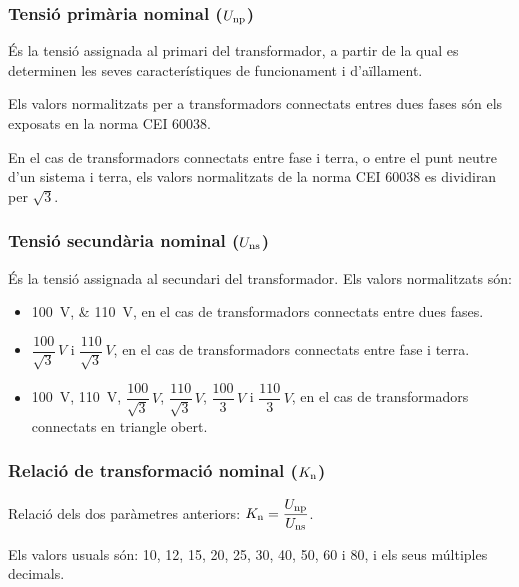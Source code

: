 \subsubsection{Tensió primària nominal ($U_\mathrm{np}$)}

És la tensió assignada al primari del transformador, a partir de la
qual es determinen les seves característiques de funcionament i
d'aïllament.

Els valors normalitzats per a transformadors connectats entres dues fases són els exposats en la norma CEI 60038.

En el cas de transformadors connectats entre fase i terra, o entre el punt neutre d'un sistema i terra, els valors normalitzats de la norma CEI 60038 es dividiran per $\sqrt{3}$.


\subsubsection{Tensió secundària nominal ($U_\mathrm{ns}$)}

És la tensió assignada al secundari del transformador.
Els valors normalitzats són:
\begin{itemize}
    \item \SIlist{100;110}{V}, en el cas de transformadors connectats
    entre dues fases.
    \item $\dfrac{100}{\sqrt{3}}\si{\,V}$ i
        $\dfrac{110}{\sqrt{3}}\si{\,V}$, en el cas de transformadors
        connectats entre fase i terra.
    \item \SI{100}{V}, \SI{110}{V}, $\dfrac{100}{\sqrt{3}}\si{\,V}$,
    $\dfrac{110}{\sqrt{3}}\si{\,V}$, $\dfrac{100}{3}\si{\,V}$   i
    $\dfrac{110}{3}\si{\,V}$, en el cas de transformadors
    connectats en triangle obert.
\end{itemize}

\subsubsection{Relació de transformació nominal ($K_\mathrm{n}$)}

 Relació  dels dos paràmetres anteriors: $K_\mathrm{n} = \dfrac{U_\mathrm{np}}{U_\mathrm{ns}}$.

 Els valors usuals són: 10, 12, 15, 20, 25, 30, 40, 50, 60 i 80, i els seus múltiples decimals.

